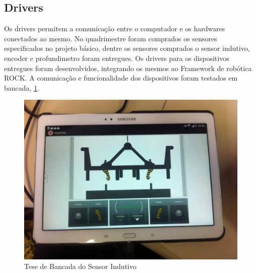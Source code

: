 \noindent
\subsection{Drivers}
Os drivers permitem a comunicação entre o computador e os hardwares conectados ao mesmo. 
No quadrimestre foram comprados os sensores especificados no projeto básico, dentre os sensores comprados o sensor indutivo, encoder e profundimetro foram entregues. 
Os drivers para os dispositivos entregues foram desenvolvidos, integrando os mesmos ao Framework de robótica ROCK. 
A comunicação e funcionalidade dos dispositivos foram testados em bancada, \ref{fig:teste_bancada}. 

\begin{figure}[ht!]
    \centering \includegraphics[width=1\columnwidth]{figs/resultados/UI}
    \caption{Tese de Bancada do Sensor Indutivo}
    \label{fig:teste_bancada}
\end{figure}


  
